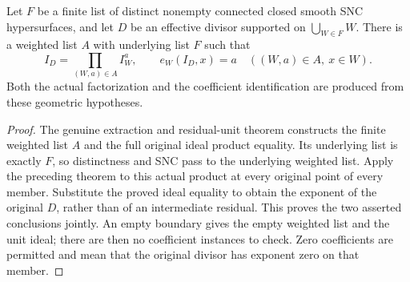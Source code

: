 \begin{theorem}
\label{hir:component-factorization-original-coefficients}
\leanok
Let $F$ be a finite list of distinct nonempty connected closed smooth
SNC hypersurfaces, and let $D$ be an effective divisor supported on
$\bigcup_{W\in F}W$.
There is a weighted list $A$ with underlying list $F$ such that
\[
 I_D=\prod_{(W,a)\in A} I_W^a,
 \qquad e_W(I_D,x)=a\quad((W,a)\in A,\ x\in W).
\]
Both the actual factorization and the coefficient identification are
produced from these geometric hypotheses.
\end{theorem}
\begin{proof}
The genuine extraction and residual-unit theorem constructs the finite
weighted list $A$ and the full original ideal product equality.
Its underlying list is exactly $F$, so distinctness and SNC pass to
the underlying weighted list.
Apply the preceding theorem to this actual product at every original
point of every member.  Substitute the proved ideal equality to obtain
the exponent of the original $D$, rather than of an intermediate
residual.  This proves the two asserted conclusions jointly.
An empty boundary gives the empty weighted list and the unit ideal;
there are then no coefficient instances to check.
Zero coefficients are permitted and mean that the original divisor
has exponent zero on that member.
\end{proof}
